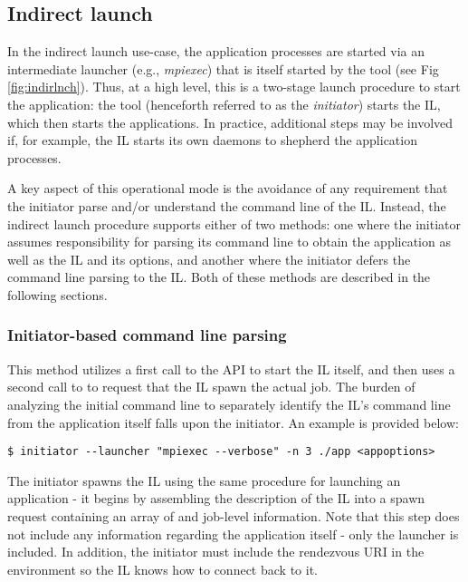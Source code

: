 \subsection{Indirect launch}
\label{chap:api_tools:indirect}

In the indirect launch use-case, the application processes are started via an intermediate launcher (e.g., \emph{mpiexec}) that is itself started by the tool (see Fig \ref{fig:indirlnch}). Thus, at a high level, this is a two-stage launch procedure to start the application: the tool (henceforth referred to as the \emph{initiator}) starts the \ac{IL}, which then starts the applications. In practice, additional steps may be involved if, for example, the \ac{IL} starts its own daemons to shepherd the application processes.

A key aspect of this operational mode is the avoidance of any requirement that the initiator parse and/or understand the command line of the \ac{IL}. Instead, the indirect launch procedure supports either of two methods: one where the initiator assumes responsibility for parsing its command line to obtain the application as well as the \ac{IL} and its options, and another where the initiator defers the command line parsing to the \ac{IL}. Both of these methods are described in the following sections.

\subsubsection{Initiator-based command line parsing}
\label{chap:api_tools:indirect:tool}

This method utilizes a first call to the  \ac{API} to start the \ac{IL} itself, and then uses a second call to  to request that the \ac{IL} spawn the actual job. The burden of analyzing the initial command line to separately identify the \ac{IL}'s command line from the application itself falls upon the initiator. An example is provided below:

\begin{verbatim}
$ initiator --launcher "mpiexec --verbose" -n 3 ./app <appoptions>
\end{verbatim}

The initiator spawns the \ac{IL} using the same procedure for launching an application - it begins by assembling the description of the \ac{IL} into a spawn request containing an array of  and  job-level information. Note that this step does not include any information regarding the application itself - only the launcher is included. In addition, the initiator must include the rendezvous \ac{URI} in the environment so the \ac{IL} knows how to connect back to it.

